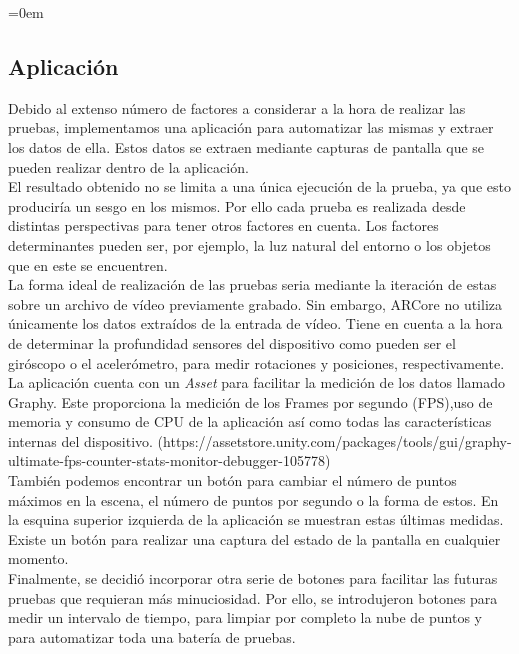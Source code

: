 \parindent=0em
\subsection{Aplicación}
\noindent

Debido al extenso número de factores a considerar a la hora de realizar las pruebas, implementamos una aplicación para automatizar las mismas y extraer los datos de ella. Estos datos se extraen mediante capturas de pantalla que se pueden realizar dentro de la aplicación. \\ 

El resultado obtenido no se limita a una única ejecución de la prueba, ya que esto produciría un sesgo en los mismos. Por ello cada prueba es realizada desde distintas perspectivas para tener otros factores en cuenta. Los factores determinantes pueden ser, por ejemplo, la luz natural del entorno o los objetos que en este se encuentren.\\ 

La forma ideal de realización de las pruebas seria mediante la iteración de estas sobre un archivo de vídeo previamente grabado. Sin embargo, ARCore no utiliza únicamente los datos extraídos de la entrada de vídeo. Tiene en cuenta a la hora de determinar la profundidad sensores del dispositivo como pueden ser el giróscopo o el acelerómetro, para medir rotaciones y posiciones, respectivamente.\\

La aplicación cuenta con un \textit{Asset} para facilitar la medición de los datos llamado Graphy. Este proporciona la medición de los Frames por segundo (FPS),uso de memoria y consumo de CPU de la aplicación así como todas las características internas del dispositivo. (https://assetstore.unity.com/packages/tools/gui/graphy-ultimate-fps-counter-stats-monitor-debugger-105778) \\

También podemos encontrar un botón para cambiar el número de puntos máximos en la escena, el número de puntos por segundo o la forma de estos. 
En la esquina superior izquierda de la aplicación se muestran estas últimas medidas. Existe un botón para realizar una captura del estado de la pantalla en cualquier momento.\\

Finalmente, se decidió incorporar otra serie de botones para facilitar las futuras pruebas que requieran más minuciosidad. Por ello, se introdujeron botones para medir un intervalo de tiempo, para limpiar por completo la nube de puntos y para automatizar toda una batería de pruebas.\\

